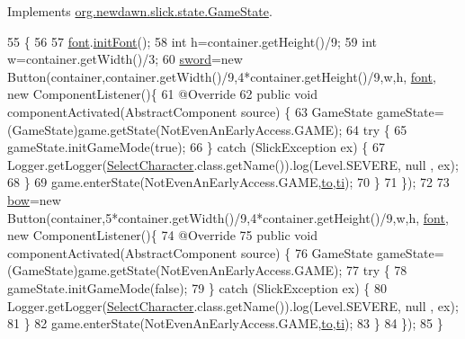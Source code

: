 Implements \mbox{\hyperlink{interfaceorg_1_1newdawn_1_1slick_1_1state_1_1_game_state_aa799a369e0fcfe6822d2d586fa6f5bbc}{org.\+newdawn.\+slick.\+state.\+Game\+State}}.


\begin{DoxyCode}
55                                                                                                      \{
56         
57         \mbox{\hyperlink{classstates_1_1_select_character_aacd9a8008cf64ff8e04eb05d0af88ce7}{font}}.\mbox{\hyperlink{classgui_1_1_g_u_i_font_ae1fccb6783e7c0f11fdcedd36362585d}{initFont}}();
58         \textcolor{keywordtype}{int} h=container.getHeight()/9;
59         \textcolor{keywordtype}{int} w=container.getWidth()/3;
60         \mbox{\hyperlink{classstates_1_1_select_character_af4275da4746fa27d2db5b23c55e70cf4}{sword}}=\textcolor{keyword}{new} Button(container,container.getWidth()/9,4*container.getHeight()/9,w,h,
      \mbox{\hyperlink{classstates_1_1_select_character_aacd9a8008cf64ff8e04eb05d0af88ce7}{font}}, \textcolor{keyword}{new} ComponentListener()\{
61             @Override
62             \textcolor{keyword}{public} \textcolor{keywordtype}{void} componentActivated(AbstractComponent source) \{
63                 GameState gameState=(GameState)game.getState(NotEvenAnEarlyAccess.GAME);
64                 \textcolor{keywordflow}{try} \{
65                     gameState.initGameMode(\textcolor{keyword}{true});
66                 \} \textcolor{keywordflow}{catch} (SlickException ex) \{
67                     Logger.getLogger(\mbox{\hyperlink{classstates_1_1_select_character_a9062e830d534afc91e4f79940aed82b9}{SelectCharacter}}.class.getName()).log(Level.SEVERE, null
      , ex);
68                 \}
69                 game.enterState(NotEvenAnEarlyAccess.GAME,\mbox{\hyperlink{classstates_1_1_select_character_a68834105cf56b725541f4fb94ca14d31}{to}},\mbox{\hyperlink{classstates_1_1_select_character_af8f40fad4e926ebbb979340c12ecb326}{ti}});
70             \}
71         \});
72         
73         \mbox{\hyperlink{classstates_1_1_select_character_ade5eda408476aabd909efe788573df89}{bow}}=\textcolor{keyword}{new} Button(container,5*container.getWidth()/9,4*container.getHeight()/9,w,h,
      \mbox{\hyperlink{classstates_1_1_select_character_aacd9a8008cf64ff8e04eb05d0af88ce7}{font}}, \textcolor{keyword}{new} ComponentListener()\{
74             @Override
75             \textcolor{keyword}{public} \textcolor{keywordtype}{void} componentActivated(AbstractComponent source) \{
76                 GameState gameState=(GameState)game.getState(NotEvenAnEarlyAccess.GAME);
77                 \textcolor{keywordflow}{try} \{
78                     gameState.initGameMode(\textcolor{keyword}{false});
79                 \} \textcolor{keywordflow}{catch} (SlickException ex) \{
80                     Logger.getLogger(\mbox{\hyperlink{classstates_1_1_select_character_a9062e830d534afc91e4f79940aed82b9}{SelectCharacter}}.class.getName()).log(Level.SEVERE, null
      , ex);
81                 \}
82                 game.enterState(NotEvenAnEarlyAccess.GAME,\mbox{\hyperlink{classstates_1_1_select_character_a68834105cf56b725541f4fb94ca14d31}{to}},\mbox{\hyperlink{classstates_1_1_select_character_af8f40fad4e926ebbb979340c12ecb326}{ti}});
83             \}
84         \});
85     \}
\end{DoxyCode}
